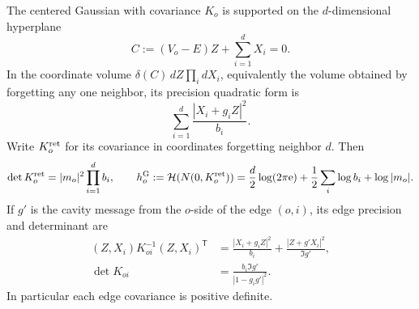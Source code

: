 \begin{lemma}\label{lem:tree-precision}
The centered Gaussian with covariance \(K_o\) is supported on the
\(d\)-dimensional hyperplane
\begin{equation}\label{eq:star-constraint}
 C:=(V_o-E)Z+\sum_{i=1}^dX_i=0.
\end{equation}
In the coordinate volume
\(\delta(C)\,dZ\prod_i dX_i\), equivalently the volume obtained by
forgetting any one neighbor, its precision quadratic form is
\begin{equation}\label{eq:star-precision}
 \sum_{i=1}^d\frac{|X_i+g_iZ|^2}{b_i}.
\end{equation}
Write \(K_o^{\rm ret}\) for its covariance in coordinates forgetting
neighbor \(d\).  Then
\begin{equation}\label{eq:star-determinant}
 \det K_o^{\rm ret}=|m_o|^2\prod_{i=1}^d b_i,
 \qquad
 h_o^{\rm G}:=\mathcal H(N(0,K_o^{\rm ret}))
 =\frac d2\log(2\pi\mathrm e)+\frac12\sum_i\log b_i+\log|m_o|.
\end{equation}
If \(g'\) is the cavity message from the \(o\)-side of the edge
\((o,i)\), its edge precision and determinant are
\begin{align}
 (Z,X_i)K_{oi}^{-1}(Z,X_i)^{\mathsf T}
 &=\frac{|X_i+g_iZ|^2}{b_i}
       +\frac{|Z+g'X_i|^2}{\Im g'},\label{eq:edge-precision}\\
 \det K_{oi}&=\frac{b_i\Im g'}{|1-g_i g'|^2}.
 \label{eq:edge-determinant}
\end{align}
In particular each edge covariance is positive definite.
\end{lemma}

